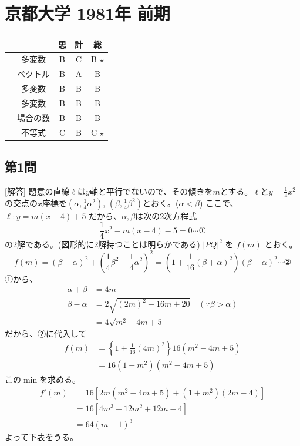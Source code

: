 \documentclass[../main.tex]{subfiles}
\begin{document}
\section*{京都大学 1981年 前期}
\begin{center}
  \begin{tabular}{|c|c|c|c|c|}
    \hline
    & & 思 & 計 & 総 \\ \hline
    [1] & 多変数 & B & C & B $\star$ \\ \hline
    [2] & ベクトル & B & A & B \\ \hline
    [3] & 多変数 & B & B & B \\ \hline
    [4] & 多変数 & B & B & B \\ \hline
    [5] & 場合の数 & B & B & B \\ \hline
    [6] & 不等式 & C & B & C $\star$ \\ \hline
  \end{tabular}
\end{center}

\subsection*{第1問}
[解答] 題意の直線$\ell$は$y$軸と平行でないので、その傾きを$m$とする。$\ell$と$y=\frac{1}{4}x^2$の交点の$x$座標を$\left(\alpha, \frac{1}{4}\alpha^2\right)$, $\left(\beta, \frac{1}{4}\beta^2\right)$とおく。($\alpha < \beta$)
ここで、$\ell : y = m(x-4)+5$ だから、$\alpha, \beta$は次の2次方程式
\[ \frac{1}{4}x^2 - m(x-4) - 5 = 0 \cdots \text{①} \]
の2解である。(図形的に2解持つことは明らかである) $|PQ|^2$ を $f(m)$ とおく。
\[ f(m) = (\beta - \alpha)^2 + \left( \frac{1}{4}\beta^2 - \frac{1}{4}\alpha^2 \right)^2 = \left( 1 + \frac{1}{16}(\beta + \alpha)^2 \right)(\beta - \alpha)^2 \cdots \text{②} \]
①から、
\begin{align*}
  \alpha + \beta &= 4m \\
  \beta - \alpha &= 2 \sqrt{(2m)^2 - 16m + 20} \quad (\because \beta > \alpha) \\
  &= 4 \sqrt{m^2 - 4m + 5}
\end{align*}
だから、②に代入して
\begin{align*}
  f(m) &= \left\{ 1 + \frac{1}{16}(4m)^2 \right\} 16(m^2 - 4m + 5) \\
  &= 16(1+m^2)(m^2 - 4m + 5)
\end{align*}
この$\min$を求める。
\begin{align*}
  f'(m) &= 16 \left[ 2m(m^2-4m+5) + (1+m^2)(2m-4) \right] \\
  &= 16 \left[ 4m^3 - 12m^2 + 12m - 4 \right] \\
  &= 64 (m-1)^3
\end{align*}
よって下表をうる。
\end{document}
